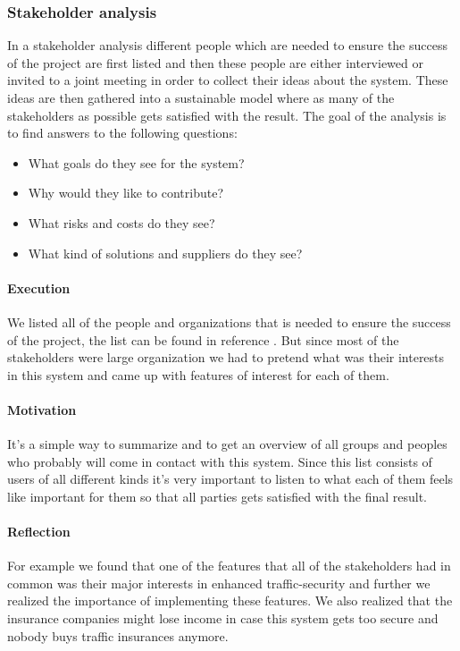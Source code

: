 \documentclass[10pt]{article}
\begin{document}
\subsubsection{Stakeholder analysis}
In a stakeholder analysis different people which are needed to ensure the success of the project are first listed and then these people are either interviewed or invited to a joint meeting in order to collect their ideas about the system. These ideas are then gathered into a sustainable model where as many of the stakeholders as possible gets satisfied with the result. The goal of the analysis is to find answers to the following questions:
\begin{itemize}
\item What goals do they see for the system?
\item Why would they like to contribute?
\item What risks and costs do they see?
\item What kind of solutions and suppliers do they see?
\end{itemize}

\paragraph{Execution}
\hfill \break
We listed all of the people and organizations that is needed to ensure the success of the project, the list can be found in reference \cite{pmv2}. But since most of the stakeholders were large organization we had to pretend what was their interests in this system and came up with features of interest for each of them.
\paragraph{Motivation}
\hfill \break
It’s a simple way to summarize and to get an overview of all groups and peoples who probably will come in contact with this system. Since this list consists of users of all different kinds it's very important to listen to what each of them feels like important for them so that all parties gets satisfied with the final result.
\paragraph{Reflection}
\hfill \break
For example we found that one of the features that all of the stakeholders had in common was their major interests in enhanced traffic-security and further we realized the importance of implementing these features. We also realized that the insurance companies might lose income in case this system gets too secure and nobody buys traffic insurances anymore.
\end{document}
